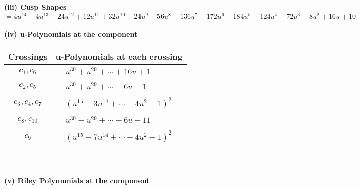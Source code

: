 \documentclass[1p]{elsarticle_modified}
\theoremstyle{definition}
\begin{document}
\flushleft \textbf{(iii) Cusp Shapes $= 4 u^{14}+4 u^{13}+24 u^{12}+12 u^{11}+32 u^{10}-24 u^9-56 u^8-136 u^7-172 u^6-184 u^5-124 u^4-72 u^3-8 u^2+16 u+10$}\\~\\
\newpage\renewcommand{\arraystretch}{1}
\flushleft \textbf{(iv) u-Polynomials at the component}\newline \\
\begin{tabular}{m{50pt}|m{274pt}}
Crossings & \hspace{64pt}u-Polynomials at each crossing \\
\hline $$\begin{aligned}c_{1},c_{6}\end{aligned}$$&$\begin{aligned}
&u^{30}+u^{29}+\cdots+16 u+1
\end{aligned}$\\
\hline $$\begin{aligned}c_{2},c_{5}\end{aligned}$$&$\begin{aligned}
&u^{30}+u^{29}+\cdots-6 u-1
\end{aligned}$\\
\hline $$\begin{aligned}c_{3},c_{4},c_{7}\end{aligned}$$&$\begin{aligned}
&(u^{15}-3 u^{14}+\cdots+4 u^2-1)^{2}
\end{aligned}$\\
\hline $$\begin{aligned}c_{8},c_{10}\end{aligned}$$&$\begin{aligned}
&u^{30}- u^{29}+\cdots-6 u-11
\end{aligned}$\\
\hline $$\begin{aligned}c_{9}\end{aligned}$$&$\begin{aligned}
&(u^{15}-7 u^{14}+\cdots+4 u^2-1)^{2}
\end{aligned}$\\
\hline
\end{tabular}\\~\\
\newpage\renewcommand{\arraystretch}{1}
\flushleft \textbf{(v) Riley Polynomials at the component}\newline \\
\end{document}
